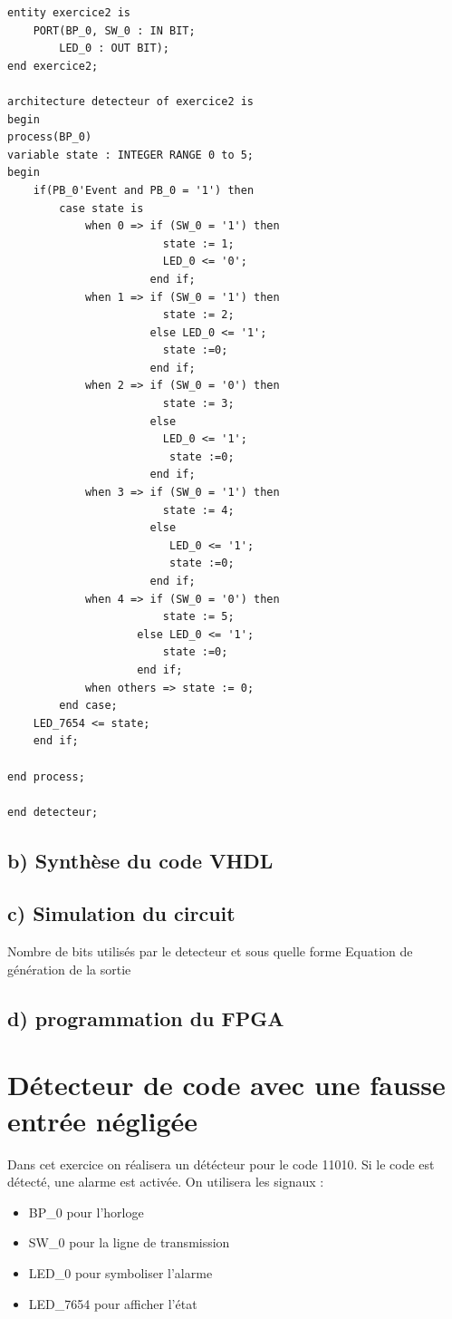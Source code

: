 \documentclass[11pt]{report}
\begin{document}
\begin{lstlisting}
entity exercice2 is
	PORT(BP_0, SW_0 : IN BIT;
		LED_0 : OUT BIT);
end exercice2;

architecture detecteur of exercice2 is
begin
process(BP_0)
variable state : INTEGER RANGE 0 to 5;
begin
	if(PB_0'Event and PB_0 = '1') then
		case state is
			when 0 => if (SW_0 = '1') then 
						state := 1; 
						LED_0 <= '0'; 
					  end if;
			when 1 => if (SW_0 = '1') then 
						state := 2; 
					  else LED_0 <= '1'; 
						state :=0; 
					  end if;
			when 2 => if (SW_0 = '0') then 
						state := 3; 
					  else 
					  	LED_0 <= '1';
					  	 state :=0; 
					  end if;
			when 3 => if (SW_0 = '1') then 
						state := 4; 
					  else
					  	 LED_0 <= '1'; 
					  	 state :=0; 
					  end if;
			when 4 => if (SW_0 = '0') then 
						state := 5; 
					else LED_0 <= '1'; 
						state :=0;
					end if;
			when others => state := 0;
		end case;
	LED_7654 <= state;
	end if;

end process;

end detecteur;

\end{lstlisting}


\subsection{ b) Synthèse du code VHDL }
 
  \subsection{ c) Simulation du circuit}
  
  Nombre de bits utilisés par le detecteur et sous quelle forme
  Equation de génération de la sortie
  
  
   \subsection{ d) programmation du FPGA}


\section{Détecteur de code avec une fausse entrée négligée}

Dans cet exercice on réalisera un détécteur pour le code 11010. Si le code est détecté, une alarme est activée. On utilisera les signaux :
\begin{itemize}
	\item BP\_0 pour l'horloge
	\item SW\_0 pour la ligne de transmission
	\item LED\_0 pour symboliser l'alarme
	\item LED\_7654 pour afficher l'état

\end{itemize}
\end{document}
